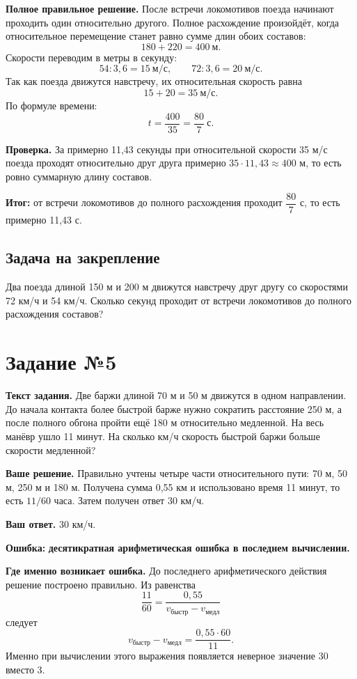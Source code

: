 \documentclass[12pt,a4paper]{article}
\newcommand{\errorlabel}[1]{\textcolor{errred}{\textbf{Ошибка:}} \textbf{#1}}
\newcommand{\finalresult}[1]{\textcolor{resultteal}{\textbf{Итог:}} #1}
\begin{document}
\textbf{Полное правильное решение.} После встречи локомотивов поезда начинают проходить один относительно другого. Полное расхождение произойдёт, когда относительное перемещение станет равно сумме длин обоих составов:
\[
180+220=400\ \text{м}.
\]
Скорости переводим в метры в секунду:
\[
54:3{,}6=15\ \text{м/с},\qquad 72:3{,}6=20\ \text{м/с}.
\]
Так как поезда движутся навстречу, их относительная скорость равна
\[
15+20=35\ \text{м/с}.
\]
По формуле времени:
\[
t=\frac{400}{35}=\frac{80}{7}\ \text{с}.
\]

\textbf{Проверка.} За примерно 11,43 секунды при относительной скорости 35 м/с поезда проходят относительно друг друга примерно $35\cdot11{,}43\approx400$ м, то есть ровно суммарную длину составов.

\finalresult{от встречи локомотивов до полного расхождения проходит $\dfrac{80}{7}$ с, то есть примерно 11,43 с.}

\subsection*{Задача на закрепление}
Два поезда длиной 150 м и 200 м движутся навстречу друг другу со скоростями 72 км/ч и 54 км/ч. Сколько секунд проходит от встречи локомотивов до полного расхождения составов?

\newpage
{}\label{task:5}
\section*{Задание №5}
\textbf{Текст задания.} Две баржи длиной 70 м и 50 м движутся в одном направлении. До начала контакта более быстрой барже нужно сократить расстояние 250 м, а после полного обгона пройти ещё 180 м относительно медленной. На весь манёвр ушло 11 минут. На сколько км/ч скорость быстрой баржи больше скорости медленной?

\textbf{Ваше решение.} Правильно учтены четыре части относительного пути: 70 м, 50 м, 250 м и 180 м. Получена сумма 0,55 км и использовано время 11 минут, то есть $11/60$ часа. Затем получен ответ 30 км/ч.

\textbf{Ваш ответ.} 30 км/ч.

\errorlabel{десятикратная арифметическая ошибка в последнем вычислении.}

\textbf{Где именно возникает ошибка.} До последнего арифметического действия решение построено правильно. Из равенства
\[
\frac{11}{60}=\frac{0{,}55}{v_{\text{быстр}}-v_{\text{медл}}}
\]
следует
\[
v_{\text{быстр}}-v_{\text{медл}}=\frac{0{,}55\cdot60}{11}.
\]
Именно при вычислении этого выражения появляется неверное значение 30 вместо 3.
\end{document}
